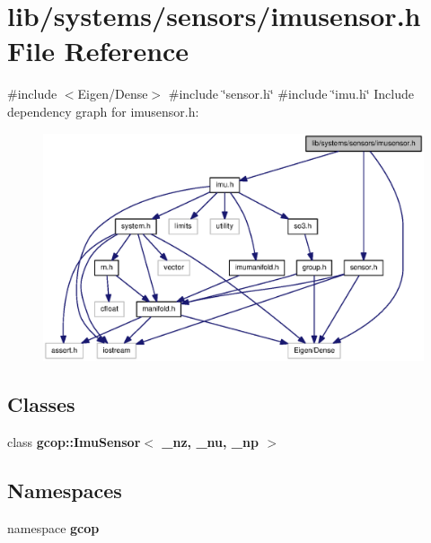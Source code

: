 \section{lib/systems/sensors/imusensor.h \-File \-Reference}
\label{imusensor_8h}
{\ttfamily \#include $<$\-Eigen/\-Dense$>$}\*
{\ttfamily \#include \char`\"{}sensor.\-h\char`\"{}}\*
{\ttfamily \#include \char`\"{}imu.\-h\char`\"{}}\*
\-Include dependency graph for imusensor.\-h\-:\nopagebreak
\begin{figure}[H]
\begin{center}
\leavevmode
\includegraphics[width=350pt]{imusensor_8h__incl}
\end{center}
\end{figure}
\subsection*{\-Classes}
\begin{DoxyCompactItemize}
\item 
class {\bf gcop\-::\-Imu\-Sensor$<$ \-\_\-nz, \-\_\-nu, \-\_\-np $>$}
\end{DoxyCompactItemize}
\subsection*{\-Namespaces}
\begin{DoxyCompactItemize}
\item 
namespace {\bf gcop}
\end{DoxyCompactItemize}
